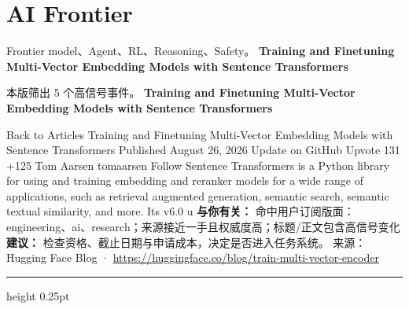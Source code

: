\documentclass[10.5pt]{ctexart}
\begin{document}
\section*{AI Frontier}
{\color{ormuted} Frontier model、Agent、RL、Reasoning、Safety。}
\vspace{2mm}
{\LARGE\bfseries Training and Finetuning Multi-Vector Embedding Models with Sentence Transformers}\par
\vspace{1mm}
{\color{ormuted} 本版筛出 5 个高信号事件。}
\vspace{3mm}
{\Large\bfseries Training and Finetuning Multi-Vector Embedding Models with Sentence Transformers}\par
Back to Articles Training and Finetuning Multi-Vector Embedding Models with Sentence Transformers Published August 26, 2026 Update on GitHub Upvote 131 +125 Tom Aarsen tomaarsen Follow Sentence Transformers is a Python library for using and training embedding and reranker models for a wide range of applications, such as retrieval augmented generation, semantic search, semantic textual similarity, and more. Its v6.0 u
\textbf{与你有关：} 命中用户订阅版面：engineering、ai、research；来源接近一手且权威度高；标题/正文包含高信号变化
\textbf{建议：} 检查资格、截止日期与申请成本，决定是否进入任务系统。
{\footnotesize\color{ormuted} 来源：Hugging Face Blog · \url{https://huggingface.co/blog/train-multi-vector-encoder}}
\vspace{4mm}
\hrule height 0.25pt
\vspace{3mm}
\end{document}
